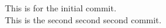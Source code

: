 \documentclass[12pt]{article}
\begin{document}
	This is for the initial commit.	
	\\ This is the second second second commit.
\end{document}
